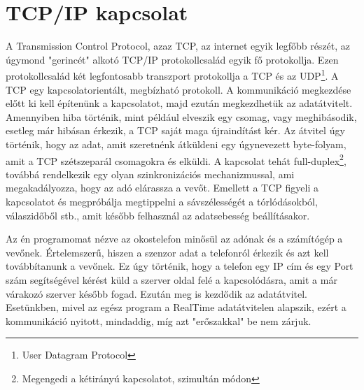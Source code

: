 \documentclass{thesis-ekf}
\theoremstyle{definition}
\theoremstyle{remark}
\begin{document}
\section{TCP/IP kapcsolat}
A Transmission Control Protocol, azaz TCP, az internet egyik legfőbb részét, az úgymond "gerincét" alkotó TCP/IP protokollcsalád egyik fő protokollja. Ezen protokollcsalád két legfontosabb transzport protokollja a TCP és az UDP\footnote{User Datagram Protocol}. A TCP egy kapcsolatorientált, megbízható protokoll. A kommunikáció megkezdése előtt ki kell építenünk a kapcsolatot, majd ezután megkezdhetük az adatátvitelt. Amennyiben hiba történik, mint például elveszik egy csomag, vagy meghibásodik, esetleg már hibásan érkezik, a TCP saját maga újraindítást kér. Az átvitel úgy történik, hogy az adat, amit szeretnénk átküldeni egy úgynevezett byte-folyam, amit a TCP szétszeparál csomagokra és elküldi. A kapcsolat tehát full-duplex\footnote{Megengedi a kétirányú kapcsolatot, szimultán módon}, továbbá rendelkezik egy olyan szinkronizációs mechanizmussal, ami megakadályozza, hogy az adó elárassza a vevőt. Emellett a TCP figyeli a kapcsolatot és megpróbálja megtippelni a sávszélességét a tórlódásokból, válaszidőből stb., amit később felhasznál az adatsebesség beállításakor.
\par Az én programomat nézve az okostelefon minősül az adónak és a számítógép a vevőnek. Értelemszerű, hiszen a szenzor adat a telefonról érkezik és azt kell továbbítanunk a vevőnek. Ez úgy történik, hogy a telefon egy IP cím és egy Port szám segítségével kérést küld a szerver oldal felé a kapcsolódásra, amit a már várakozó szerver később fogad. Ezután meg is kezdődik az adatátvitel. Esetünkben, mivel az egész program a RealTime adatátvitelen alapszik, ezért a kommunikáció nyitott, mindaddig, míg azt "erőszakkal" be nem zárjuk.
\end{document}
